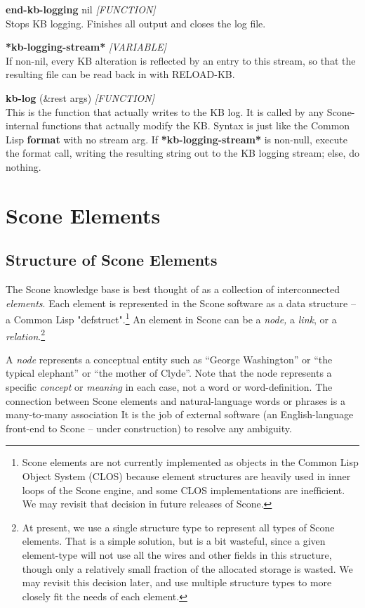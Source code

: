 \documentclass[titlepage,twoside,openright,11pt]{article}
\begin{document}
\textbf{end-kb-logging} nil \emph{{[}FUNCTION{]}\\
}Stops KB logging. Finishes all output and closes the log file.

\textbf{*kb-logging-stream*} \emph{{[}VARIABLE{]}}\\
If non-nil, every KB alteration is reflected by an entry to this stream,
so that the resulting file can be read back in with RELOAD-KB.

\textbf{kb-log} (\&rest args) \emph{{[}FUNCTION{]}}\\
This is the function that actually writes to the KB log. It is called by
any Scone-internal functions that actually modify the KB. Syntax is just
like the Common Lisp \textbf{format} with no stream arg. If
\textbf{*kb-logging-stream*} is non-null, execute the format call,
writing the resulting string out to the KB logging stream; else, do
nothing.

\section{Scone Elements}\label{scone-elements}

\subsection{Structure of Scone
Elements}\label{structure-of-scone-elements}

The Scone knowledge base is best thought of as a collection of
interconnected \emph{elements}. Each element is represented in the Scone
software as a data structure -- a Common Lisp "defstruct".\footnote{Scone
  elements are not currently implemented as objects in the Common Lisp
  Object System (CLOS) because element structures are heavily used in
  inner loops of the Scone engine, and some CLOS implementations are
  inefficient. We may revisit that decision in future releases of Scone.}
An element in Scone can be a \emph{node,} a \emph{link}, or a
\emph{relation}.\footnote{At present, we use a single structure type to
  represent all types of Scone elements. That is a simple solution, but
  is a bit wasteful, since a given element-type will not use all the
  wires and other fields in this structure, though only a relatively
  small fraction of the allocated storage is wasted. We may revisit this
  decision later, and use multiple structure types to more closely fit
  the needs of each element.}

A \emph{node} represents a conceptual entity such as ``George
Washington'' or ``the typical elephant'' or ``the mother of Clyde''.
Note that the node represents a specific \emph{concept} or
\emph{meaning} in each case, not a word or word-definition. The
connection between Scone elements and natural-language words or phrases
is a many-to-many association It is the job of external software (an
English-language front-end to Scone -- under construction) to resolve
any ambiguity.
\end{document}
